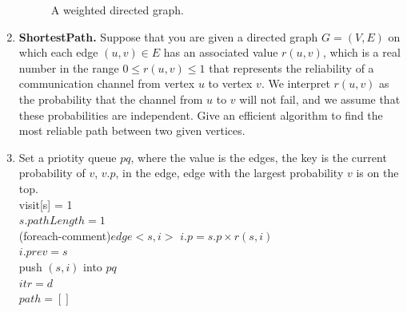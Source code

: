 \documentclass[12pt,a4paper]{article}
\makeatletter
\newtheorem*{solution}{Solution}
\theoremstyle{definition}
\renewenvironment{solution}[1][Solution] {\par\pushQED{\qed}\normalfont\topsep6\p@\@plus6\p@\relax\trivlist\item[\hskip\labelsep\bfseries#1\@addpunct{.}]\ignorespaces}{\popQED\endtrivlist\@endpefalse} \makeatother
\makeatother
\begin{document}
\begin{enumerate}
\begin{figure}[htbp]
\caption{A weighted directed graph.}
\end{figure}

\item \textbf{ShortestPath.} Suppose that you are given a directed graph $G=(V,E)$ on which each edge $(u,v) \in E$ has an associated value $r(u,v)$, which is a real number in the range $0 \leq r(u,v) \leq 1$ that represents the reliability of a communication channel from vertex $u$ to vertex $v$. We interpret $r(u,v)$ as the probability that the channel from $u$ to $v$ will not fail, and we assume that these probabilities are independent. Give an efficient algorithm to find the most reliable path between two given vertices.

\begin{solution}
  \begin{flushleft}
  \end{flushleft}
  \begin{algorithm}[H]
    Set a priotity queue $pq$, where the value is the edges, the key is the current probability of $v$, $v.p$, in the edge, edge with the largest probability $v$ is on the top. \\
    visit[s] = 1 \\
    $s.pathLength = 1$ \\
    \ForEach(foreach-comment){$edge<s,i>$}{
      $i.p = s.p \times r(s,i)$ \\
      $i.prev = s$ \\
      push $(s,i)$ into $pq$  \\
  
    }
    $itr = d$ \\
    $path=[]$ \\
  \end{algorithm}
  \end{solution}


\end{enumerate}
\end{document}
